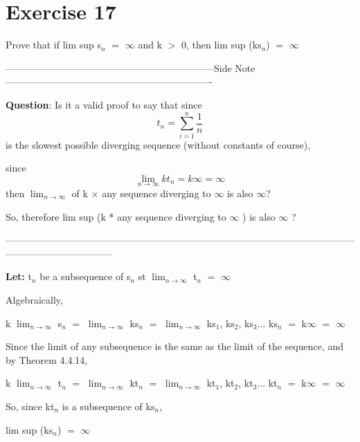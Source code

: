\documentclass{article}
\newcommand{\mt}[1]{\ensuremath{#1}}
\newcommand\bsc[2][\DefaultOpt]{%
  \def\DefaultOpt{#2}%
  \section[#1]{#2}%
}
\newcommand{\lt}[1]{\textbf{Let: } #1}
\newcommand{\sidenote}[1]{-----------------------------------------------------------------Side Note----------------------------------------------------------------
#1 \

---------------------------------------------------------------------------------------------------------------------------------------------}
\newcommand{\gr}{\mt{>} }
\newcommand{\eql}{\mt{=} }
\newcommand{\uw}[2]{#1\mt{_{#2}}}
\newcommand{\lmti}[1]{\mt{\displaystyle{\lim_{#1 \to \infty}}}}
\newcommand{\eqn}[1]{\[#1\]}
\newcommand{\infy}{\mt{\infty} }
\begin{document}
\bsc{Exercise 17}{

Prove that if lim sup \uw{s}{n} \eql \infy and k \gr 0, then lim sup (k\uw{s}{n}) \eql \infy

\sidenote{
\textbf{Question}: Is it a valid proof to say that since
\eqn{t_n = \sum_{i = 1}^n \frac{1}{n}}
is the slowest possible diverging sequence (without constants of course),

since
\eqn{\lmti{n} kt_n = k \infty = \infty}
then \lmti{n} of k $\times$ any sequence diverging to \infy is also $\infty$?

So, therefore lim sup (k * any sequence diverging to \infy) is also \infy?
}

\lt{\uw{t}{n} be a subsequence of \uw{s}{n} st \lmti{n} \uw{t}{n} \eql \infy}

Algebraically,
 
k \lmti{n} \uw{s}{n} \eql \lmti{n} k\uw{s}{n} \eql \lmti{n} k\uw{s}{1}, k\uw{s}{2}, k\uw{s}{3}... k\uw{s}{n} \eql k\infy \eql \infy

Since the limit of any subsequence is the same as the limit of the sequence, and by Theorem 4.4.14,

k \lmti{n} \uw{t}{n} \eql \lmti{n} k\uw{t}{n} \eql \lmti{n} k\uw{t}{1}, k\uw{t}{2}, k\uw{t}{3}... k\uw{t}{n} \eql k\infy \eql \infy

So, since k\uw{t}{n} is a subsequence of k\uw{s}{n},

lim sup (k\uw{s}{n}) \eql \infy


}
\end{document}

